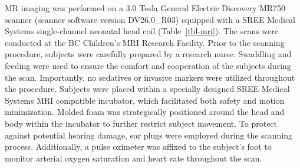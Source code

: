 \documentclass[
sn-nature
]{sn-jnl}
\begin{document}
MR imaging was performed on a 3.0 Tesla General Electric Discovery MR750
scanner (scanner software version DV26.0\_R03) equipped with a SREE
Medical Systems single-channel neonatal head coil (Table~\ref{tbl-mri}).
The scans were conducted at the BC Children's MRI Research Facility.
Prior to the scanning procedure, subjects were carefully prepared by a
research nurse. Swaddling and feeding were used to ensure the comfort
and cooperation of the subjects during the scan. Importantly, no
sedatives or invasive markers were utilized throughout the procedure.
Subjects were placed within a specially designed SREE Medical Systems
MRI compatible incubator, which facilitated both safety and motion
minimization. Molded foam was strategically positioned around the head
and body within the incubator to further restrict subject movement. To
protect against potential hearing damage, ear plugs were employed during
the scanning process. Additionally, a pulse oximeter was affixed to the
subject's foot to monitor arterial oxygen saturation and heart rate
throughout the scan.
\end{document}
